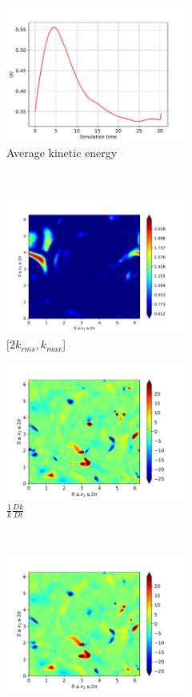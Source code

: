 \begin{figure}[H]
    \begin{subfigure}[H]{0.45\textwidth}
        \includegraphics[height=1.75in]{media/run-cds-65/ke-average1360}
        \caption{Average kinetic energy}
    \end{subfigure}
    ~
    \begin{subfigure}[H]{0.45\textwidth}
        \includegraphics[height=1.75in]{media/run-cds-65/ke-2-1360}
        \caption{$[2k_{rms}, k_{max} $] }
    \end{subfigure}
    \newline
    \begin{subfigure}[H]{0.45\textwidth}
        \includegraphics[height=1.75in]{media/run-cds-65/ke-1360}
        \caption{$\frac{1}{k} \frac{D k}{Dt}$}
    \end{subfigure}
    ~
    \begin{subfigure}{0.45\textwidth}
        \includegraphics[height=1.75in]{media/run-cds-65/A-ke-1360}

\end{subfigure}
\end{figure}
